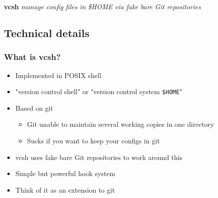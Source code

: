 \documentclass[t]{beamer}
\begin{document}
\begin{frame}
		\begin{center}
			\vfill
			\vfill
			\textbf{vcsh}
			\vfill
			\textit{manage config files in \$HOME via fake bare Git repositories}
			\vfill
			\vfill
		\end{center}
\end{frame}

\subsection{Technical details}

\begin{frame}
	\frametitle{What is vcsh?}
	\begin{itemize}
		\item Implemented in POSIX shell
		\item "version control shell" or "version control system \texttt{\$HOME}"
		\item Based on git
		\begin{itemize}
			\item Git unable to maintain several working copies in one directory
			\item Sucks if you want to keep your configs in git
		\end{itemize}
		\item vcsh uses fake bare Git repositories to work around this
		\item Simple but powerful hook system
		\item Think of it as an extension to git
	\end{itemize}
\end{frame}
\end{document}
